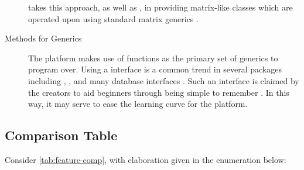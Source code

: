 \begin{description}
		 takes this approach, as well as , in providing
		matrix-like classes which are operated upon using standard matrix
		generics \cites{pbdDMATpackage,kane13:bigmemory}.
	\item[Methods for \pkg{dplyr}
	Generics] The platform makes use of  functions as the primary set of generics to program over.
		Using a  interface is a common trend in several \R{} packages including , , and many database interfaces \cites{luraschi20,zj20}.
		Such an interface is claimed by the  creators to aid beginners through being simple to remember \cite{wickham2019welcome}.
		In this way, it may serve to ease the learning curve for the platform.
\end{description}

\subsection{Comparison Table}\label{subsec:comp-tab}


Consider \cref{tab:feature-comp}, with elaboration given in the enumeration below:

